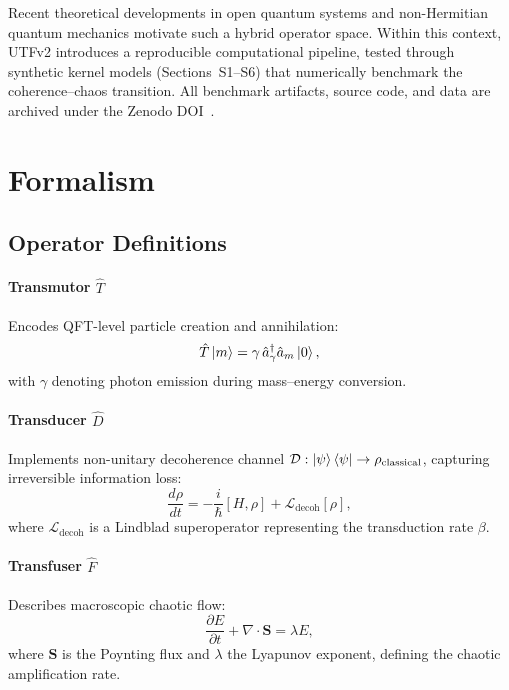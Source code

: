 \documentclass[12pt]{article}
\begin{document}
Recent theoretical developments in open quantum systems
and non-Hermitian quantum mechanics motivate such a hybrid operator space.
Within this context, UTFv2 introduces a reproducible computational
pipeline, tested through synthetic kernel models (Sections~S1–S6)
that numerically benchmark the coherence–chaos transition.
All benchmark artifacts, source code, and data are archived under the
Zenodo DOI~\cite{Pathania2024Quantum, Xu2019Extreme, MatsoukasRoubeas2024Quantum}.


\section{Formalism}
\subsection{Operator Definitions}
\paragraph{Transmutor $\hat{T}$}
Encodes QFT-level particle creation and annihilation:
\begin{equation}
    \hat{T}\ket{m} = \gamma\, \hat{a}^\dagger_{\gamma} \hat{a}_m \ket{0},
\end{equation}
with $\gamma$ denoting photon emission during mass–energy conversion.

\paragraph{Transducer $\hat{D}$}
Implements non-unitary decoherence channel
$\mathcal{D}: \ket{\psi}\bra{\psi} \rightarrow \rho_{\mathrm{classical}}$,
capturing irreversible information loss:
\begin{equation}
    \frac{d\rho}{dt} = -\frac{i}{\hbar}[H,\rho] + \mathcal{L}_{\mathrm{decoh}}[\rho],
\end{equation}
where $\mathcal{L}_{\mathrm{decoh}}$ is a Lindblad superoperator representing the
transduction rate $\beta$.

\paragraph{Transfuser $\hat{F}$}
Describes macroscopic chaotic flow:
\begin{equation}
    \frac{\partial E}{\partial t} + \nabla\cdot\bm{S} = \lambda E,
\end{equation}
where $\bm{S}$ is the Poynting flux and $\lambda$ the Lyapunov exponent,
defining the chaotic amplification rate.
\end{document}
